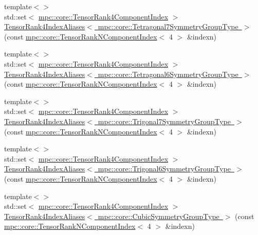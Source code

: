 \begin{DoxyCompactItemize}
\item 
{\footnotesize template$<$$>$ }\\std\+::set$<$ \mbox{\hyperlink{namespacempc_1_1core_a54c081f41b2475abd10182bf023805d2}{mpc\+::core\+::\+Tensor\+Rank4\+Component\+Index}} $>$ \mbox{\hyperlink{namespacempc_1_1core_afc0e41f61af45d956b4d550c3bb1cb43}{Tensor\+Rank4\+Index\+Aliases$<$ mpc\+::core\+::\+Tetragonal7\+Symmetry\+Group\+Type $>$}} (const \mbox{\hyperlink{classmpc_1_1core_1_1_tensor_rank_n_component_index}{mpc\+::core\+::\+Tensor\+Rank\+N\+Component\+Index}}$<$ 4 $>$ \&indexn)
\item 
{\footnotesize template$<$$>$ }\\std\+::set$<$ \mbox{\hyperlink{namespacempc_1_1core_a54c081f41b2475abd10182bf023805d2}{mpc\+::core\+::\+Tensor\+Rank4\+Component\+Index}} $>$ \mbox{\hyperlink{namespacempc_1_1core_a3ee16afdd151d5662c537c992869324d}{Tensor\+Rank4\+Index\+Aliases$<$ mpc\+::core\+::\+Tetragonal6\+Symmetry\+Group\+Type $>$}} (const \mbox{\hyperlink{classmpc_1_1core_1_1_tensor_rank_n_component_index}{mpc\+::core\+::\+Tensor\+Rank\+N\+Component\+Index}}$<$ 4 $>$ \&indexn)
\item 
{\footnotesize template$<$$>$ }\\std\+::set$<$ \mbox{\hyperlink{namespacempc_1_1core_a54c081f41b2475abd10182bf023805d2}{mpc\+::core\+::\+Tensor\+Rank4\+Component\+Index}} $>$ \mbox{\hyperlink{namespacempc_1_1core_ae33e5a116327851eb9d62052cf62b48b}{Tensor\+Rank4\+Index\+Aliases$<$ mpc\+::core\+::\+Trigonal7\+Symmetry\+Group\+Type $>$}} (const \mbox{\hyperlink{classmpc_1_1core_1_1_tensor_rank_n_component_index}{mpc\+::core\+::\+Tensor\+Rank\+N\+Component\+Index}}$<$ 4 $>$ \&indexn)
\item 
{\footnotesize template$<$$>$ }\\std\+::set$<$ \mbox{\hyperlink{namespacempc_1_1core_a54c081f41b2475abd10182bf023805d2}{mpc\+::core\+::\+Tensor\+Rank4\+Component\+Index}} $>$ \mbox{\hyperlink{namespacempc_1_1core_a71000356aa12b434221c52dab1ec73d5}{Tensor\+Rank4\+Index\+Aliases$<$ mpc\+::core\+::\+Trigonal6\+Symmetry\+Group\+Type $>$}} (const \mbox{\hyperlink{classmpc_1_1core_1_1_tensor_rank_n_component_index}{mpc\+::core\+::\+Tensor\+Rank\+N\+Component\+Index}}$<$ 4 $>$ \&indexn)
\item 
{\footnotesize template$<$$>$ }\\std\+::set$<$ \mbox{\hyperlink{namespacempc_1_1core_a54c081f41b2475abd10182bf023805d2}{mpc\+::core\+::\+Tensor\+Rank4\+Component\+Index}} $>$ \mbox{\hyperlink{namespacempc_1_1core_ad81cccb6866982c1a9ce3591a7a9596e}{Tensor\+Rank4\+Index\+Aliases$<$ mpc\+::core\+::\+Cubic\+Symmetry\+Group\+Type $>$}} (const \mbox{\hyperlink{classmpc_1_1core_1_1_tensor_rank_n_component_index}{mpc\+::core\+::\+Tensor\+Rank\+N\+Component\+Index}}$<$ 4 $>$ \&indexn)

\end{DoxyCompactItemize}
